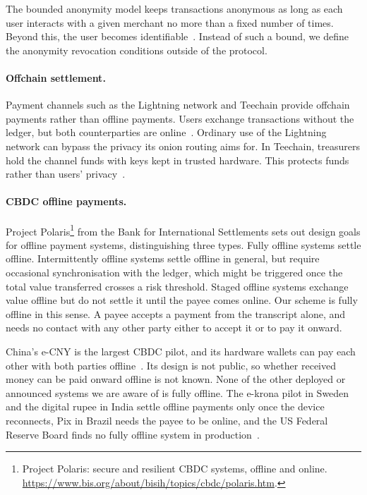 The bounded anonymity model keeps transactions anonymous as long as each user
interacts with a given merchant no more than a fixed number of times. Beyond
this, the user becomes identifiable~\cite{SCN:CamHohLys06}. Instead of such a
bound, we define the anonymity revocation conditions outside of the protocol.

\paragraph{Offchain settlement.} Payment channels such as the Lightning network
and Teechain provide offchain payments rather than offline payments. Users
exchange transactions without the ledger, but both counterparties are
online~\cite{poon2016bitcoin,lind2019teechain}. Ordinary use of the Lightning
network can bypass the privacy its onion routing aims for. In Teechain,
treasurers hold the channel funds with keys kept in trusted hardware. This
protects funds rather than users' privacy~\cite{FC:KYPKDM21,lind2019teechain}.

\paragraph{CBDC offline payments.} Project Polaris\footnote{Project Polaris:
secure and resilient CBDC systems, offline and online.
\url{https://www.bis.org/about/bisih/topics/cbdc/polaris.htm}.} from the Bank
for International Settlements sets out design goals for offline payment
systems, distinguishing three types. Fully offline systems settle offline.
Intermittently offline systems settle offline in general, but require
occasional synchronisation with the ledger, which might be triggered once the
total value transferred crosses a risk threshold. Staged offline systems
exchange value offline but do not settle it until the payee comes online. Our
scheme is fully offline in this sense. A payee accepts a payment from the
transcript alone, and needs no contact with any other party
either to accept it or to pay it onward.

China's e-CNY is the largest CBDC pilot, and its hardware wallets can pay each
other with both parties offline~\cite{pboc2021ecny,atlanticcouncil2026cbdc}.
Its design is not public, so whether received money can be paid onward offline
is not known. None of the other deployed or announced systems we are aware of
is fully offline. The e-krona pilot in Sweden and the digital rupee in India
settle offline payments only once the device reconnects, Pix in Brazil needs
the payee to be online, and the US Federal Reserve Board finds no fully offline
system in
production~\cite{brown2016corda,soderberg2019krona,lobo2021pix,aboulaiz2024offline}.


